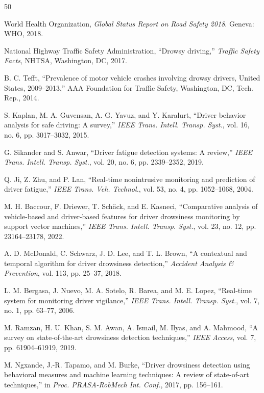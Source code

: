 \documentclass[conference]{IEEEtran}
\begin{document}
\begin{thebibliography}{50}

World Health Organization, \emph{Global Status Report on Road Safety 2018}. Geneva: WHO, 2018.

National Highway Traffic Safety Administration, ``Drowsy driving,'' \emph{Traffic Safety Facts}, NHTSA, Washington, DC, 2017.

B. C. Tefft, ``Prevalence of motor vehicle crashes involving drowsy drivers, United States, 2009--2013,'' AAA Foundation for Traffic Safety, Washington, DC, Tech. Rep., 2014.

S. Kaplan, M. A. Guvensan, A. G. Yavuz, and Y. Karalurt, ``Driver behavior analysis for safe driving: A survey,'' \emph{IEEE Trans. Intell. Transp. Syst.}, vol. 16, no. 6, pp. 3017--3032, 2015.

G. Sikander and S. Anwar, ``Driver fatigue detection systems: A review,'' \emph{IEEE Trans. Intell. Transp. Syst.}, vol. 20, no. 6, pp. 2339--2352, 2019.

Q. Ji, Z. Zhu, and P. Lan, ``Real-time nonintrusive monitoring and prediction of driver fatigue,'' \emph{IEEE Trans. Veh. Technol.}, vol. 53, no. 4, pp. 1052--1068, 2004.

M. H. Baccour, F. Driewer, T. Sch\"ack, and E. Kasneci, ``Comparative analysis of vehicle-based and driver-based features for driver drowsiness monitoring by support vector machines,'' \emph{IEEE Trans. Intell. Transp. Syst.}, vol. 23, no. 12, pp. 23164--23178, 2022.

A. D. McDonald, C. Schwarz, J. D. Lee, and T. L. Brown, ``A contextual and temporal algorithm for driver drowsiness detection,'' \emph{Accident Analysis \& Prevention}, vol. 113, pp. 25--37, 2018.

L. M. Bergasa, J. Nuevo, M. A. Sotelo, R. Barea, and M. E. Lopez, ``Real-time system for monitoring driver vigilance,'' \emph{IEEE Trans. Intell. Transp. Syst.}, vol. 7, no. 1, pp. 63--77, 2006.

M. Ramzan, H. U. Khan, S. M. Awan, A. Ismail, M. Ilyas, and A. Mahmood, ``A survey on state-of-the-art drowsiness detection techniques,'' \emph{IEEE Access}, vol. 7, pp. 61904--61919, 2019.

M. Ngxande, J.-R. Tapamo, and M. Burke, ``Driver drowsiness detection using behavioral measures and machine learning techniques: A review of state-of-art techniques,'' in \emph{Proc. PRASA-RobMech Int. Conf.}, 2017, pp. 156--161.


\end{thebibliography}
\end{document}
